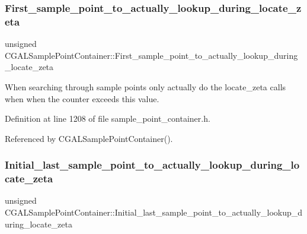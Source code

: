 \subsubsection{\texorpdfstring{First\+\_\+sample\+\_\+point\+\_\+to\+\_\+actually\+\_\+lookup\+\_\+during\+\_\+locate\+\_\+zeta}{First\_sample\_point\_to\_actually\_lookup\_during\_locate\_zeta}}
{\footnotesize\ttfamily unsigned C\+G\+A\+L\+Sample\+Point\+Container\+::\+First\+\_\+sample\+\_\+point\+\_\+to\+\_\+actually\+\_\+lookup\+\_\+during\+\_\+locate\+\_\+zeta\hspace{0.3cm}{\ttfamily [private]}}



When searching through sample points only actually do the locate\+\_\+zeta calls when when the counter exceeds this value. 



Definition at line 1208 of file sample\+\_\+point\+\_\+container.\+h.



Referenced by C\+G\+A\+L\+Sample\+Point\+Container().

\mbox{\label{classCGALSamplePointContainer_aa430905eee4411f05aadae3e60a59ff8}} 
\subsubsection{\texorpdfstring{Initial\+\_\+last\+\_\+sample\+\_\+point\+\_\+to\+\_\+actually\+\_\+lookup\+\_\+during\+\_\+locate\+\_\+zeta}{Initial\_last\_sample\_point\_to\_actually\_lookup\_during\_locate\_zeta}}
{\footnotesize\ttfamily unsigned C\+G\+A\+L\+Sample\+Point\+Container\+::\+Initial\+\_\+last\+\_\+sample\+\_\+point\+\_\+to\+\_\+actually\+\_\+lookup\+\_\+during\+\_\+locate\+\_\+zeta\hspace{0.3cm}{\ttfamily [private]}}



